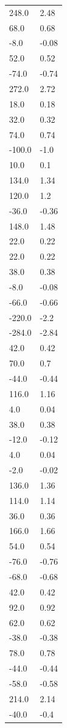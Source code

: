 \begin{longtable}{ll}
248.0 & 2.48 \\
68.0 & 0.68 \\
-8.0 & -0.08 \\
52.0 & 0.52 \\
-74.0 & -0.74 \\
272.0 & 2.72 \\
18.0 & 0.18 \\
32.0 & 0.32 \\
74.0 & 0.74 \\
-100.0 & -1.0 \\
10.0 & 0.1 \\
134.0 & 1.34 \\
120.0 & 1.2 \\
-36.0 & -0.36 \\
148.0 & 1.48 \\
22.0 & 0.22 \\
22.0 & 0.22 \\
38.0 & 0.38 \\
-8.0 & -0.08 \\
-66.0 & -0.66 \\
-220.0 & -2.2 \\
-284.0 & -2.84 \\
42.0 & 0.42 \\
70.0 & 0.7 \\
-44.0 & -0.44 \\
116.0 & 1.16 \\
4.0 & 0.04 \\
38.0 & 0.38 \\
-12.0 & -0.12 \\
4.0 & 0.04 \\
-2.0 & -0.02 \\
136.0 & 1.36 \\
114.0 & 1.14 \\
36.0 & 0.36 \\
166.0 & 1.66 \\
54.0 & 0.54 \\
-76.0 & -0.76 \\
-68.0 & -0.68 \\
42.0 & 0.42 \\
92.0 & 0.92 \\
62.0 & 0.62 \\
-38.0 & -0.38 \\
78.0 & 0.78 \\
-44.0 & -0.44 \\
-58.0 & -0.58 \\
214.0 & 2.14 \\
-40.0 & -0.4 \\

\end{longtable}
